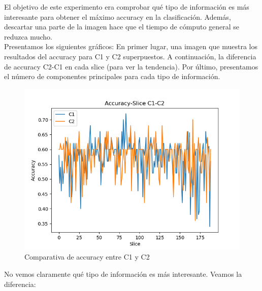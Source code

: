 El objetivo de este experimento era comprobar qué tipo de información es más interesante para obtener el máximo accuracy en la clasificación. Además, descartar una parte de la imagen hace que el tiempo de cómputo general se reduzca mucho. \\

Presentamos los siguientes gráficos: En primer lugar, una imagen que muestra los resultados del accuracy para C1 y C2 superpuestos. A continuación, la diferencia de accuracy C2-C1 en cada slice (para ver la tendencia). Por último, presentamos el número de componentes principales para cada tipo de información.

\begin{figure}[H] %
	\centering
	\includegraphics[scale=0.7]{accuracyc1c2.png}  %
	\caption{Comparativa de accuracy entre C1 y C2} 
	\label{fig:comp-c1-c2}
\end{figure}

No vemos claramente qué tipo de información es más interesante. Veamos la diferencia:

